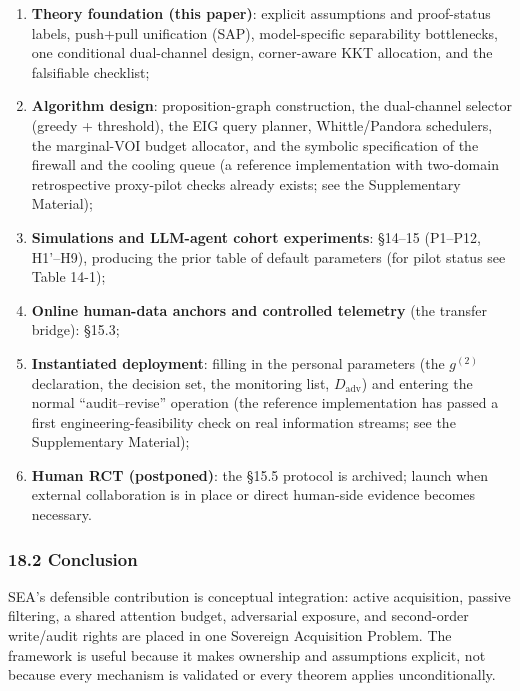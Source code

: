 \documentclass[
  11pt]{article}
\providecommand{\tightlist}{%
  \setlength{\itemsep}{0pt}\setlength{\parskip}{0pt}}
\begin{document}
\begin{enumerate}
\def\labelenumi{\arabic{enumi}.}
\tightlist
\item
  \textbf{Theory foundation (this paper)}: explicit assumptions and
  proof-status labels, push+pull unification (SAP), model-specific
  separability bottlenecks, one conditional dual-channel design,
  corner-aware KKT allocation, and the falsifiable checklist;
\item
  \textbf{Algorithm design}: proposition-graph construction, the
  dual-channel selector (greedy + threshold), the EIG query planner,
  Whittle/Pandora schedulers, the marginal-VOI budget allocator, and the
  symbolic specification of the firewall and the cooling queue (a
  reference implementation with two-domain retrospective proxy-pilot
  checks already exists; see the Supplementary Material);
\item
  \textbf{Simulations and LLM-agent cohort experiments}: §14--15
  (P1--P12, H1'--H9), producing the prior table of default parameters
  (for pilot status see Table 14-1);
\item
  \textbf{Online human-data anchors and controlled telemetry} (the
  transfer bridge): §15.3;
\item
  \textbf{Instantiated deployment}: filling in the personal parameters
  (the \(g^{(2)}\) declaration, the decision set, the monitoring list,
  \(D_{\mathrm{adv}}\)) and entering the normal ``audit--revise''
  operation (the reference implementation has passed a first
  engineering-feasibility check on real information streams; see the
  Supplementary Material);
\item
  \textbf{Human RCT (postponed)}: the §15.5 protocol is archived; launch
  when external collaboration is in place or direct human-side evidence
  becomes necessary.
\end{enumerate}

\subsubsection{18.2 Conclusion}\label{conclusion}

SEA's defensible contribution is conceptual integration: active
acquisition, passive filtering, a shared attention budget, adversarial
exposure, and second-order write/audit rights are placed in one
Sovereign Acquisition Problem. The framework is useful because it makes
ownership and assumptions explicit, not because every mechanism is
validated or every theorem applies unconditionally.
\end{document}
